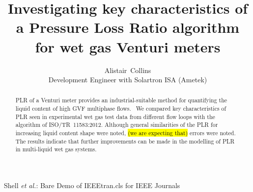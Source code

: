 \documentclass[journal]{IEEEtran}
\begin{document}
%
\title{Investigating key characteristics of a Pressure Loss Ratio algorithm for wet gas Venturi meters
}
%
%
%

\author{Alistair~Collins\\
Development Engineer with Solartron ISA (Ametek)
}


%
{Shell \MakeLowercase{\textit{et al.}}: Bare Demo of IEEEtran.cls for IEEE Journals}
% 











\maketitle

\begin{abstract}
\acrfull{PLR} of a Venturi meter provides an industrial-suitable method for quantifying the liquid content of high \acrshort{GVF} multiphase flows.  We compared key characteristics of \acrshort{PLR} seen in experimental wet gas test data from different flow loops with the algorithm of ISO/TR~11583:2012. Although general similarities of the \acrshort{PLR} for increasing liquid content shape were noted, \hl{(we are expecting that)} errors were noted. The results indicate that further improvements can be made in the modelling of \acrshort{PLR} in multi-liquid wet gas systems.
\end{abstract}
\end{document}
